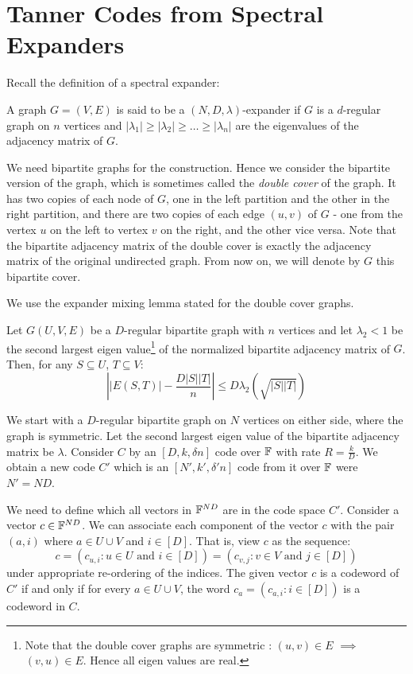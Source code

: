 \section{Tanner Codes from Spectral Expanders}

Recall the definition of a spectral expander:
\begin{definition}
A graph $G=(V,E)$ is said to be a $(N,D,\lambda)$-expander if $G$ is a $d$-regular graph on $n$ vertices and $|\lambda_1| \ge |\lambda_2| \ge \ldots \ge |\lambda_n|$ are the eigenvalues of the adjacency matrix of $G$.
\end{definition}

We need bipartite graphs for the construction. Hence we consider the 
bipartite version of the graph, which is sometimes called the {\em double cover} of the graph. It has two copies of each node of $G$, one in the left partition and the other in the right partition, and there are two copies of each edge $(u,v)$ of $G$ - one from the vertex $u$ on the left to vertex $v$ on the right, and the other vice versa. Note that the bipartite adjacency matrix of the double cover is exactly the adjacency matrix of the original undirected graph. From now on, we will denote by $G$ this bipartite cover.

We use the expander mixing lemma stated for the double cover graphs.

\begin{lemma}
Let $G(U,V,E)$ be a $D$-regular bipartite graph with $n$ vertices and let $\lambda_2<1$ be the second largest eigen value\footnote{Note that the double cover graphs are symmetric : $(u,v) \in E$ $\implies$ $(v,u) \in E$. Hence all eigen values are real.} of the normalized bipartite adjacency matrix of $G$. Then, for any $S \subseteq U$, $T \subseteq V$:
$$\left||E(S,T)|-\frac{D|S||T|}{n}\right| \le D\lambda_2 \left(\sqrt{|S||T|}\right)$$
\end{lemma}

We start with a $D$-regular bipartite graph on $N$ vertices on either side, where the graph is symmetric. Let the second largest eigen value of the bipartite adjacency matrix be $\lambda$. Consider $C$ by an $[D,k,\delta n]$ code over ${\mathbb{F}}$ with rate $R = \frac{k}{D}$. We obtain a new code $C'$ which is an $[N',k',\delta'n]$ code from it over ${\mathbb{F}}$ were $N' = ND$. 

We need to define which all vectors in ${\mathbb{F}}^{ND}$ are in the code space $C'$. Consider a vector $c \in {\mathbb{F}}^{ND}$. We can associate each component of the vector $c$ with the pair $(a,i)$ where $a \in U \cup V$ and $i \in [D]$. That is, view $c$ as the sequence:
$$c = \left( c_{u,i} : u \in U \textrm{ and } i \in [D] \right) = \left( c_{v,j} : v \in V \textrm{ and } j \in [D] \right) $$
under appropriate re-ordering of the indices.
\noindent The given vector $c$ is a codeword of $C'$ if and only if for every $a \in U \cup V$, the word $c_a = \left( c_{a,i} : i \in [D] \right)$ is a codeword in $C$. 

